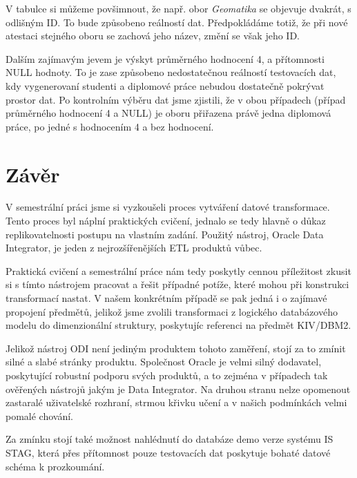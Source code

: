 V tabulce si můžeme povšimnout, že např. obor \textit{Geomatika} se objevuje dvakrát, s odlišným ID.
To bude způsobeno reálností dat.
Předpokládáme totiž, že při nové atestaci stejného oboru se zachová jeho název, změní se však jeho ID.

Dalším zajímavým jevem je výskyt průměrného hodnocení 4, a přítomnosti NULL hodnoty.
To je zase způsobeno nedostatečnou reálností testovacích dat, kdy vygenerovaní studenti a diplomové práce nebudou dostatečně pokrývat prostor dat.
Po kontrolním výběru dat jsme zjistili, že v obou případech (případ průměrného hodnocení 4 a NULL) je oboru přiřazena právě jedna diplomová práce, po jedné s hodnocením 4 a bez hodnocení.

\section{Závěr}

V semestrální práci jsme si vyzkoušeli proces vytváření datové transformace.
Tento proces byl náplní praktických cvičení, jednalo se tedy hlavně o důkaz replikovatelnosti postupu na vlastním zadání.
Použitý nástroj, Oracle Data Integrator, je jeden z nejrozšířenějších ETL produktů vůbec.

Praktická cvičení a semestrální práce nám tedy poskytly cennou příležitost zkusit si s tímto nástrojem pracovat a řešit případné potíže, které mohou při konstrukci transformací nastat.
V našem konkrétním případě se pak jedná i o zajímavé propojení předmětů, jelikož jsme zvolili transformaci z logického databázového modelu do dimenzionální struktury, poskytujíc referenci na předmět KIV/DBM2.

Jelikož nástroj ODI není jediným produktem tohoto zaměření, stojí za to zmínit silné a slabé stránky produktu.
Společnost Oracle je velmi silný dodavatel, poskytující robustní podporu svých produktů, a to zejména v případech tak ověřených nástrojů jakým je Data Integrator.
Na druhou stranu nelze opomenout zastaralé uživatelské rozhraní, strmou křivku učení a v našich podmínkách velmi pomalé chování.

Za zmínku stojí také možnost nahlédnutí do databáze demo verze systému IS STAG, která přes přítomnost pouze testovacích dat poskytuje bohaté datové schéma k prozkoumání.

